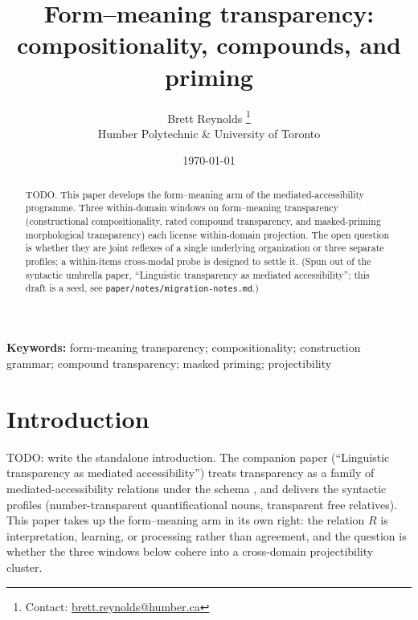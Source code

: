 \documentclass[12pt]{article}
\title{Form--meaning transparency: compositionality, compounds, and priming}
\author{Brett Reynolds \orcidlink{0000-0003-0073-7195}%
\thanks{Contact: \href{mailto:brett.reynolds@humber.ca}{brett.reynolds@humber.ca}}\\
Humber Polytechnic \& University of Toronto}
\date{\today}
\begin{document}
\maketitle

\begin{abstract}
TODO. This paper develops the form--meaning arm of the mediated-accessibility programme. Three within-domain windows on form--meaning transparency (constructional compositionality, rated compound transparency, and masked-priming morphological transparency) each license within-domain projection. The open question is whether they are joint reflexes of a single underlying organization or three separate profiles; a within-items cross-modal probe is designed to settle it. (Spun out of the syntactic umbrella paper, \enquote{Linguistic transparency as mediated accessibility}; this draft is a seed, see \texttt{paper/notes/migration-notes.md}.)
\end{abstract}

\noindent\textbf{Keywords:} form-meaning transparency; compositionality; construction grammar; compound transparency; masked priming; projectibility

\section{Introduction}\label{sec:fm-intro}

TODO: write the standalone introduction. The companion paper (\enquote{Linguistic transparency as mediated accessibility}) treats transparency as a family of mediated-accessibility relations under the schema , and delivers the syntactic profiles (number-transparent quantificational nouns, transparent free relatives). This paper takes up the form--meaning arm in its own right: the relation $R$ is interpretation, learning, or processing rather than agreement, and the question is whether the three windows below cohere into a cross-domain projectibility cluster.




\end{document}
